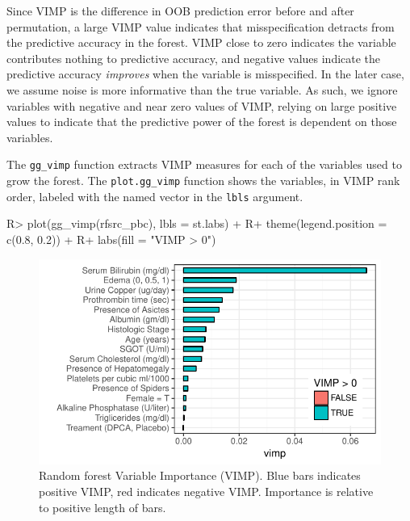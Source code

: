 \documentclass[article, nojss]{jss}
\begin{document}
Since VIMP is the difference in OOB prediction error before and after
permutation, a large VIMP value indicates that misspecification detracts
from the predictive accuracy in the forest. VIMP close to zero indicates
the variable contributes nothing to predictive accuracy, and negative
values indicate the predictive accuracy \emph{improves} when the
variable is misspecified. In the later case, we assume noise is more
informative than the true variable. As such, we ignore variables with
negative and near zero values of VIMP, relying on large positive values
to indicate that the predictive power of the forest is dependent on
those variables.

The \texttt{gg\_vimp} function extracts VIMP measures for each of the
variables used to grow the forest. The \texttt{plot.gg\_vimp} function
shows the variables, in VIMP rank order, labeled with the named vector
in the \texttt{lbls} argument.

\begin{Schunk}
\begin{Sinput}
R> plot(gg_vimp(rfsrc_pbc), lbls = st.labs) +
R+   theme(legend.position = c(0.8, 0.2)) +
R+   labs(fill = "VIMP > 0")
\end{Sinput}
\begin{figure}[!htb]

{\centering \includegraphics{rfs-rf-vimp-1}

}

\caption[Random forest Variable Importance (VIMP)]{Random forest Variable Importance (VIMP). Blue bars indicates positive VIMP, red indicates negative VIMP. Importance is relative to positive length of bars.}\label{fig:rf-vimp}
\end{figure}
\end{Schunk}
\end{document}
